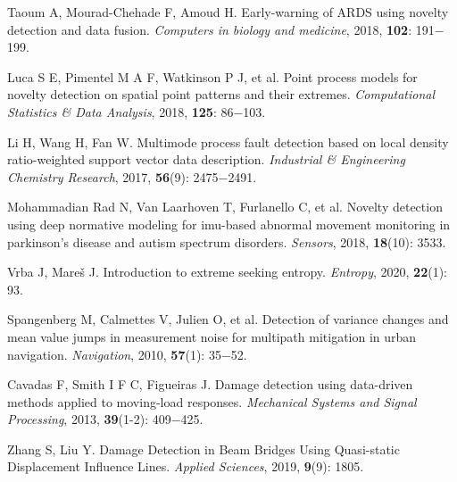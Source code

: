 \documentclass{Style/aas}
\begin{document}
\begin{multicols}{2}
\begin{thebibliography}{99}
     Taoum A, Mourad-Chehade F, Amoud H. Early-warning of ARDS using novelty detection and data fusion. {\sl Computers in biology and medicine}, 2018, {\bf 102}: 191$-$199.

     Luca S E, Pimentel M A F, Watkinson P J, et al. Point process models for novelty detection on spatial point patterns and their extremes. {\sl  Computational Statistics \& Data Analysis}, 2018, {\bf 125}: 86$-$103.

     Li H, Wang H, Fan W. Multimode process fault detection based on local density ratio-weighted support vector data description. {\sl Industrial \& Engineering Chemistry Research}, 2017, {\bf 56}(9): 2475$-$2491.

     Mohammadian Rad N, Van Laarhoven T, Furlanello C, et al. Novelty detection using deep normative modeling for imu-based abnormal movement monitoring in parkinson’s disease and autism spectrum disorders. {\sl Sensors}, 2018, {\bf 18}(10): 3533.

     Vrba J, Mareš J. Introduction to extreme seeking entropy. {\sl Entropy}, 2020, {\bf 22}(1): 93.

     Spangenberg M, Calmettes V, Julien O, et al. Detection of variance changes and mean value jumps in measurement noise for multipath mitigation in urban navigation. {\sl Navigation}, 2010, {\bf 57}(1): 35$-$52.

     Cavadas F, Smith I F C, Figueiras J. Damage detection using data-driven methods applied to moving-load responses. {\sl Mechanical Systems and Signal Processing}, 2013, {\bf 39}(1-2): 409$-$425.

     Zhang S, Liu Y. Damage Detection in Beam Bridges Using Quasi-static Displacement Influence Lines. {\sl Applied Sciences}, 2019, {\bf 9}(9): 1805.

    
   

    
  




    


















\end{thebibliography}
\end{multicols}
\end{document}
